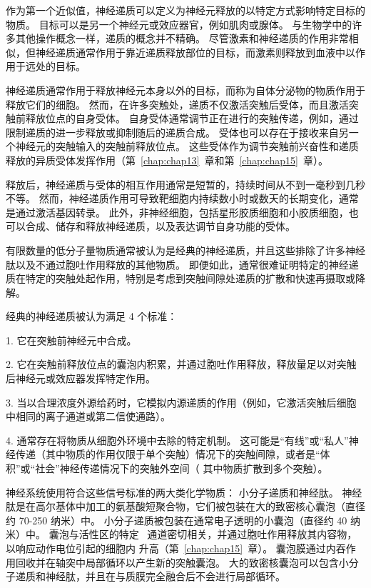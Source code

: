 作为第一个近似值，神经递质可以定义为神经元释放的以特定方式影响特定目标的物质。
目标可以是另一个神经元或效应器官，例如肌肉或腺体。 
与生物学中的许多其他操作概念一样，递质的概念并不精确。
尽管激素和神经递质的作用非常相似，但神经递质通常作用于靠近递质释放部位的目标，而激素则释放到血液中以作用于远处的目标。


神经递质通常作用于释放神经元本身以外的目标，而称为自体分泌物的物质作用于释放它们的细胞。
然而，在许多突触处，递质不仅激活突触后受体，而且激活突触前释放位点的自身受体。
自身受体通常调节正在进行的突触传递，例如，通过限制递质的进一步释放或抑制随后的递质合成。
受体也可以存在于接收来自另一个神经元的突触输入的突触前释放位点。
这些受体作为调节突触前兴奋性和递质释放的异质受体发挥作用（第~\ref{chap:chap13}~章和第~\ref{chap:chap15}~章）。


释放后，神经递质与受体的相互作用通常是短暂的，持续时间从不到一毫秒到几秒不等。
然而，神经递质作用可导致靶细胞内持续数小时或数天的长期变化，通常是通过激活基因转录。
此外，非神经细胞，包括星形胶质细胞和小胶质细胞，也可以合成、储存和释放神经递质，以及表达调节自身功能的受体。


有限数量的低分子量物质通常被认为是经典的神经递质，并且这些排除了许多神经肽以及不通过胞吐作用释放的其他物质。
即便如此，通常很难证明特定的神经递质在特定的突触处起作用，特别是考虑到突触间隙处递质的扩散和快速再摄取或降解。


经典的神经递质被认为满足 4 个标准：

1. 它在突触前神经元中合成。

2. 它在突触前释放位点的囊泡内积累，并通过胞吐作用释放，释放量足以对突触后神经元或效应器发挥特定作用。

3. 当以合理浓度外源给药时，它模拟内源递质的作用（例如，它激活突触后细胞中相同的离子通道或第二信使通路）。

4. 通常存在将物质从细胞外环境中去除的特定机制。 这可能是“有线”或“私人”神经传递（其中物质的作用仅限于单个突触）情况下的突触间隙，或者是“体积”或“社会”神经传递情况下的突触外空间（ 其中物质扩散到多个突触）。


神经系统使用符合这些信号标准的两大类化学物质：
小分子递质和神经肽。
神经肽是在高尔基体中加工的氨基酸短聚合物，它们被包装在大的致密核心囊泡（直径约 70-250 纳米）中。
小分子递质被包装在通常电子透明的小囊泡（直径约 40 纳米）中。
囊泡与活性区的特定~ 通道密切相关，并通过胞吐作用释放其内容物，以响应动作电位引起的细胞内  升高（第~\ref{chap:chap15}~章）。
囊泡膜通过内吞作用回收并在轴突中局部循环以产生新的突触囊泡。
大的致密核囊泡可以包含小分子递质和神经肽，并且在与质膜完全融合后不会进行局部循环。



